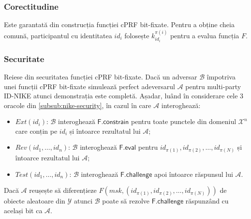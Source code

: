 \documentclass[oneside, 12pt]{book}
\begin{document}
\subsubsection{Corectitudine}
	Este garantată din construcția funcției cPRF bit-fixate. Pentru a obține cheia comună, participantul cu identitatea $id_i$ folosește $k^{\pi(i)}_{id_i}$ pentru a evalua funcția $F$.

\subsubsection{Securitate}
	Reiese din securitatea funcției cPRF bit-fixate. Dacă un adversar $\mathcal{B}$ împotriva unei funcții cPRF bit-fixate simulează perfect adeversarul $\mathcal{A}$ pentru multi-party ID-NIKE atunci demonstrația este completă. Așadar, luând în considerare cele $3$ oracole din \ref{subsub:nike-security}, în cazul în care $\mathcal{A}$ interoghează:
	\begin{itemize}
		\item $Ext(id_i)$: $\mathcal{B}$ interoghează $\mathsf{F.constrain}$ pentru toate punctele din domeniul $\mathcal{X}^n$ care conțin pe $id_i$ și întoarce rezultatul lui $\mathcal{A}$;
		\item $Rev(id_1, \dots, id_n)$: $\mathcal{B}$ interoghează $\mathsf{F.eval}$ pentru $id_{\pi(1)}, id_{\pi(2)}, \dots, id_{\pi(N)}$ și întoarce rezultatul lui $\mathcal{A}$;
		\item $Test(id_1, \dots, id_n)$: $\mathcal{B}$ interoghează $\mathsf{F.challenge}$ apoi întoarce răspunsul lui $\mathcal{A}$.
	\end{itemize}

	Dacă $\mathcal{A}$ reușește să diferențieze $F(msk, (id_{\pi(1)}, id_{\pi(2)}, \dots, id_{\pi(N)}))$ de obiecte aleatoare din $\mathcal{Y}$ atunci $\mathcal{B}$ poate să rezolve $\mathsf{F.challenge}$ răspunzând cu același bit ca $\mathcal{A}$.
\end{document}
